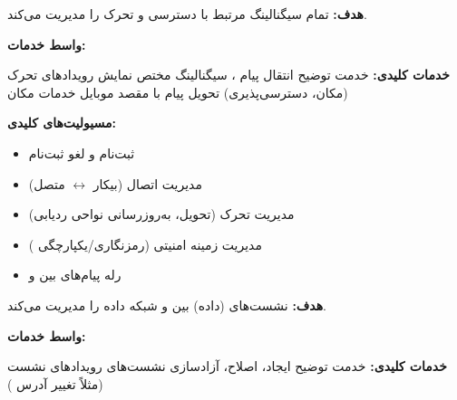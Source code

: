 
\CNchained{}



\textbf{هدف:} تمام سیگنالینگ مرتبط با دسترسی و تحرک  را مدیریت می‌کند.

\textbf{واسط خدمات:} 

\textbf{خدمات کلیدی:}\CNbr{}\lr{\textbar{}} خدمت \lr{\textbar{}} توضیح \lr{\textbar{}}\CNbr{}\CNbr{} انتقال پیام ، سیگنالینگ مختص  \lr{\textbar{}}\CNbr{} نمایش رویدادهای تحرک (مکان، دسترسی‌پذیری) \lr{\textbar{}}\CNbr{} تحویل پیام با مقصد موبایل \lr{\textbar{}}\CNbr{} خدمات مکان  \lr{\textbar{}}

\textbf{مسیولیت‌های کلیدی:}

\begin{itemize}
\tightlist
\item
  ثبت‌نام و لغو ثبت‌نام 
\item
  مدیریت اتصال (بیکار \ensuremath{\leftrightarrow} متصل)
\item
  مدیریت تحرک (تحویل، به‌روزرسانی نواحی ردیابی)
\item
  مدیریت زمینه امنیتی (رمزنگاری/\allowbreak{}یکپارچگی )
\item
  رله پیام‌های  بین  و 
\end{itemize}


\textbf{هدف:} نشست‌های  (داده) بین  و شبکه داده را مدیریت می‌کند.

\textbf{واسط خدمات:} 

\textbf{خدمات کلیدی:}\CNbr{}\lr{\textbar{}} خدمت \lr{\textbar{}} توضیح \lr{\textbar{}}\CNbr{}\CNbr{} ایجاد، اصلاح، آزادسازی نشست‌های  \lr{\textbar{}}\CNbr{} رویدادهای نشست  (مثلاً تغییر آدرس ) \lr{\textbar{}}

